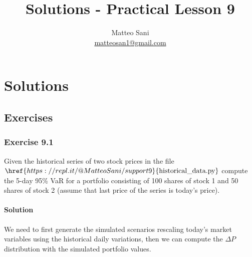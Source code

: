 \documentclass[11pt]{article}
\title{Solutions - Practical Lesson 9}
\author{Matteo Sani\\\href{mailto:matteosan1@gmail.com}{matteosan1@gmail.com}}
\begin{document}
    
    \maketitle
    
    

    
    \hypertarget{solutions---practical-lesson-9}{%
\section{Solutions}\label{solutions---practical-lesson-9}}

\hypertarget{exercises}{%
\subsection{Exercises}\label{exercises}}

\hypertarget{exercise-9.1}{%
\subsubsection{Exercise 9.1}\label{exercise-9.1}}

Given the historical series of two stock prices in the file
\(\href{https://repl.it/@MatteoSani/support9}{\textrm{historical\_data.py}}\)
compute the 5-day 95\% VaR for a portfolio consisting of 100 shares of
stock 1 and 50 shares of stock 2 (assume that last price of the series
is today's price).

\hypertarget{solution}{%
\paragraph{Solution}\label{solution}}

We need to first generate the simulated scenarios rescaling today's
market variables using the historical daily variations, then we can
compute the \(\Delta P\) distribution with the simulated portfolio
values.
\end{document}
